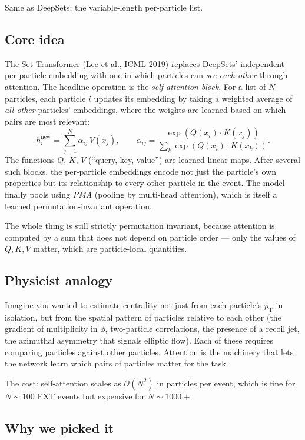 \documentclass[11pt]{article}
\newcommand{\pT}{\ensuremath{p_{\text{T}}}}
\begin{document}
Same as DeepSets: the variable-length per-particle list.

\subsection{Core idea}

The Set Transformer (Lee et al., ICML 2019) replaces DeepSets'
independent per-particle embedding with one in which particles can
\emph{see each other} through attention. The headline operation is
the \emph{self-attention block}. For a list of $N$ particles, each
particle $i$ updates its embedding by taking a weighted average of
\emph{all other} particles' embeddings, where the weights are learned
based on which pairs are most relevant:
\[
   h_i^{\text{new}} = \sum_{j=1}^N \alpha_{ij}\, V(x_j),
   \qquad
   \alpha_{ij} = \frac{\exp(Q(x_i) \cdot K(x_j))}{\sum_k \exp(Q(x_i) \cdot K(x_k))}.
\]
The functions $Q$, $K$, $V$ (``query, key, value'') are learned linear
maps. After several such blocks, the per-particle embeddings encode
not just the particle's own properties but its relationship to every
other particle in the event. The model finally pools using
\emph{PMA} (pooling by multi-head attention), which is itself a
learned permutation-invariant operation.

The whole thing is still strictly permutation invariant, because
attention is computed by a sum that does not depend on particle order
--- only the values of $Q, K, V$ matter, which are particle-local
quantities.

\subsection{Physicist analogy}

Imagine you wanted to estimate centrality not just from each
particle's $\pT$ in isolation, but from the spatial pattern of
particles relative to each other (the gradient of multiplicity in
$\phi$, two-particle correlations, the presence of a recoil jet, the
azimuthal asymmetry that signals elliptic flow). Each of these
requires comparing particles against other particles. Attention is the
machinery that lets the network learn which pairs of particles matter
for the task.

The cost: self-attention scales as $\mathcal{O}(N^2)$ in particles per
event, which is fine for $N \sim 100$ FXT events but expensive for
$N \sim 1000+$.

\subsection{Why we picked it}
\end{document}
